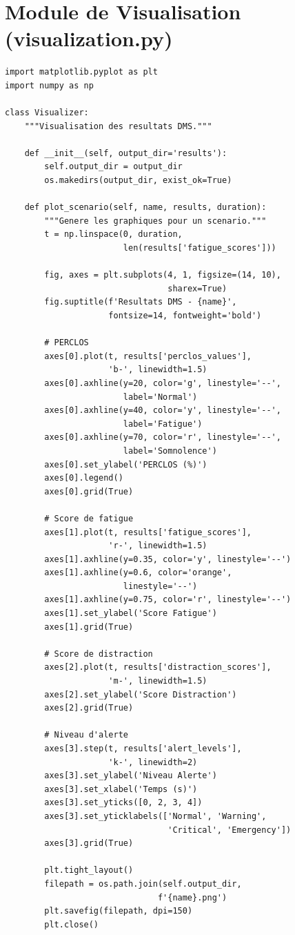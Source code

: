 \section{Module de Visualisation (visualization.py)}

\begin{lstlisting}[style=pythonstyle, caption={Extrait du module de visualisation.}, label={lst:visualization}]
import matplotlib.pyplot as plt
import numpy as np

class Visualizer:
    """Visualisation des resultats DMS."""
    
    def __init__(self, output_dir='results'):
        self.output_dir = output_dir
        os.makedirs(output_dir, exist_ok=True)
    
    def plot_scenario(self, name, results, duration):
        """Genere les graphiques pour un scenario."""
        t = np.linspace(0, duration, 
                        len(results['fatigue_scores']))
        
        fig, axes = plt.subplots(4, 1, figsize=(14, 10),
                                 sharex=True)
        fig.suptitle(f'Resultats DMS - {name}', 
                     fontsize=14, fontweight='bold')
        
        # PERCLOS
        axes[0].plot(t, results['perclos_values'], 
                     'b-', linewidth=1.5)
        axes[0].axhline(y=20, color='g', linestyle='--',
                        label='Normal')
        axes[0].axhline(y=40, color='y', linestyle='--',
                        label='Fatigue')
        axes[0].axhline(y=70, color='r', linestyle='--',
                        label='Somnolence')
        axes[0].set_ylabel('PERCLOS (%)')
        axes[0].legend()
        axes[0].grid(True)
        
        # Score de fatigue
        axes[1].plot(t, results['fatigue_scores'], 
                     'r-', linewidth=1.5)
        axes[1].axhline(y=0.35, color='y', linestyle='--')
        axes[1].axhline(y=0.6, color='orange', 
                        linestyle='--')
        axes[1].axhline(y=0.75, color='r', linestyle='--')
        axes[1].set_ylabel('Score Fatigue')
        axes[1].grid(True)
        
        # Score de distraction
        axes[2].plot(t, results['distraction_scores'], 
                     'm-', linewidth=1.5)
        axes[2].set_ylabel('Score Distraction')
        axes[2].grid(True)
        
        # Niveau d'alerte
        axes[3].step(t, results['alert_levels'], 
                     'k-', linewidth=2)
        axes[3].set_ylabel('Niveau Alerte')
        axes[3].set_xlabel('Temps (s)')
        axes[3].set_yticks([0, 2, 3, 4])
        axes[3].set_yticklabels(['Normal', 'Warning', 
                                 'Critical', 'Emergency'])
        axes[3].grid(True)
        
        plt.tight_layout()
        filepath = os.path.join(self.output_dir, 
                               f'{name}.png')
        plt.savefig(filepath, dpi=150)
        plt.close()
\end{lstlisting}
